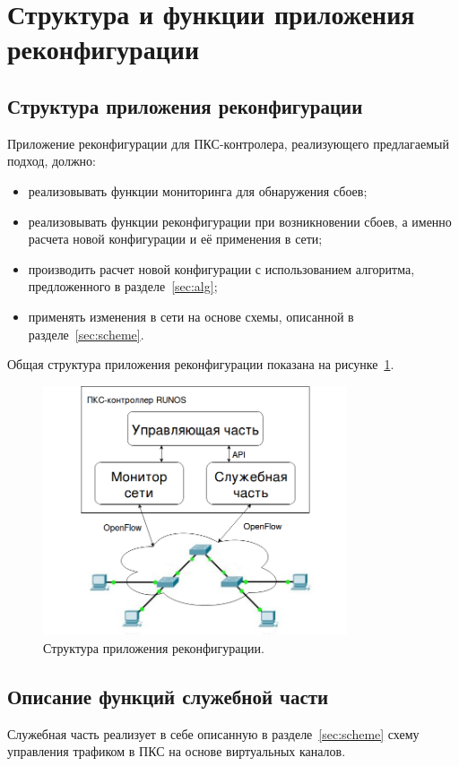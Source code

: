 \documentclass[12pt, a4paper]{article}
\begin{document}
\section{Структура и функции приложения реконфигурации}
\subsection{Структура приложения реконфигурации}

Приложение реконфигурации для ПКС-контролера, реализующего предлагаемый подход, должно:
\begin{itemize}
	\item реализовывать функции мониторинга для обнаружения сбоев;
	\item реализовывать функции реконфигурации при возникновении сбоев, а именно расчета новой конфигурации и её применения в сети;
	\item производить расчет новой конфигурации с использованием алгоритма, предложенного в разделе~\ref{sec:alg};
	\item применять изменения в сети на основе схемы, описанной в разделе~\ref{sec:scheme}.
\end{itemize}

Общая структура приложения реконфигурации показана на рисунке~\ref{pic:netcontrol}.

\begin{figure}[h!]
	\centering
	\includegraphics[width=0.80\textwidth]{img/netcontrol.png}
	\caption{Структура приложения реконфигурации.}
	\label{pic:netcontrol}
\end{figure}


\subsection{Описание функций служебной части}
Служебная часть реализует в себе описанную в разделе~\ref{sec:scheme} схему управления трафиком в ПКС на основе виртуальных каналов.
 
\end{document}

